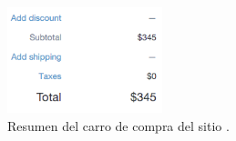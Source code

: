 
\begin{figure}[H]
	\centering
	\includegraphics[width=0.4\textwidth]{figuras/cart/examples/cart_summarize_shopify.png}
	\caption{Resumen del carro de compra del sitio \shopifyNAME.}
	\label{figure:apendice:cart:example:cart_summarize_shopify}
\end{figure}